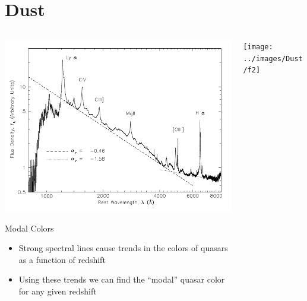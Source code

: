 \documentclass[landscape,9pt]{beamer}
\begin{document}
\section{Dust}
\begin{frame}
	\begin{columns}
		\begin{column}{0.5\textwidth}
			\centering
			\includegraphics[width=\textwidth]{../images/Talk/vandenberk_01}
			\vspace{-2mm}
			\begin{block}{Modal Colors}
				\begin{itemize}
					\item Strong spectral lines cause trends in the colors of quasars as a function of redshift
					\item Using these trends we can find the ``modal'' quasar color for any given redshift
				\end{itemize}
			\end{block}
		\end{column}
		\begin{column}{0.6\textwidth}
			\texttt{[image: ../images/Dust/f2]}
		\end{column}
	\end{columns}
\end{frame}
\end{document}
